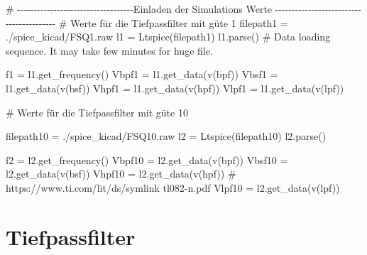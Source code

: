 \documentclass[
  ngerman,
  letterpaper,
  DIV=11]{scrreprt}
\newenvironment{Shaded}{}{}
\newcommand{\CommentTok}[1]{\textcolor[rgb]{0.42,0.45,0.49}{#1}}
\newcommand{\NormalTok}[1]{\textcolor[rgb]{0.14,0.16,0.18}{#1}}
\newcommand{\OperatorTok}[1]{\textcolor[rgb]{0.14,0.16,0.18}{#1}}
\newcommand{\StringTok}[1]{\textcolor[rgb]{0.01,0.18,0.38}{#1}}
\begin{document}
\begin{Shaded}
\begin{Highlighting}[]
\CommentTok{\# {-}{-}{-}{-}{-}{-}{-}{-}{-}{-}{-}{-}{-}{-}{-}{-}{-}{-}{-}{-}{-}{-}{-}{-}{-}{-}{-}{-}{-}{-}{-}{-}{-}{-}{-}Einladen der Simulations Werte {-}{-}{-}{-}{-}{-}{-}{-}{-}{-}{-}{-}{-}{-}{-}{-}{-}{-}{-}{-}{-}{-}{-}{-}{-}{-}{-}{-}{-}{-}{-}{-}{-}{-}{-}{-}{-}{-}{-}{-}{-}}
\CommentTok{\# Werte für die Tiefpassfilter mit güte 1}
\NormalTok{filepath1 }\OperatorTok{=} \StringTok{\textquotesingle{}./spice\_kicad/FSQ1.raw\textquotesingle{}}
\NormalTok{l1 }\OperatorTok{=}\NormalTok{ Ltspice(filepath1)}
\NormalTok{l1.parse() }\CommentTok{\# Data loading sequence. It may take few minutes for huge file.}

\NormalTok{f1 }\OperatorTok{=}\NormalTok{ l1.get\_frequency()}
\NormalTok{Vbpf1 }\OperatorTok{=}\NormalTok{ l1.get\_data(}\StringTok{\textquotesingle{}v(bpf)\textquotesingle{}}\NormalTok{)}
\NormalTok{Vbsf1 }\OperatorTok{=}\NormalTok{ l1.get\_data(}\StringTok{\textquotesingle{}v(bsf)\textquotesingle{}}\NormalTok{)}
\NormalTok{Vhpf1 }\OperatorTok{=}\NormalTok{ l1.get\_data(}\StringTok{\textquotesingle{}v(hpf)\textquotesingle{}}\NormalTok{)}
\NormalTok{Vlpf1 }\OperatorTok{=}\NormalTok{ l1.get\_data(}\StringTok{\textquotesingle{}v(lpf)\textquotesingle{}}\NormalTok{)}

\CommentTok{\# Werte für die Tiefpassfilter mit güte 10}

\NormalTok{filepath10 }\OperatorTok{=} \StringTok{\textquotesingle{}./spice\_kicad/FSQ10.raw\textquotesingle{}}
\NormalTok{l2 }\OperatorTok{=}\NormalTok{ Ltspice(filepath10)}
\NormalTok{l2.parse()}

\NormalTok{f2 }\OperatorTok{=}\NormalTok{ l2.get\_frequency()}
\NormalTok{Vbpf10 }\OperatorTok{=}\NormalTok{ l2.get\_data(}\StringTok{\textquotesingle{}v(bpf)\textquotesingle{}}\NormalTok{)}
\NormalTok{Vbsf10 }\OperatorTok{=}\NormalTok{ l2.get\_data(}\StringTok{\textquotesingle{}v(bsf)\textquotesingle{}}\NormalTok{)}
\NormalTok{Vhpf10 }\OperatorTok{=}\NormalTok{ l2.get\_data(}\StringTok{\textquotesingle{}v(hpf)\textquotesingle{}}\NormalTok{)  }\CommentTok{\# https://www.ti.com/lit/ds/symlink tl082{-}n.pdf}
\NormalTok{Vlpf10 }\OperatorTok{=}\NormalTok{ l2.get\_data(}\StringTok{\textquotesingle{}v(lpf)\textquotesingle{}}\NormalTok{)}
\end{Highlighting}
\end{Shaded}

\section{Tiefpassfilter}\label{tiefpassfilter}
\end{document}
